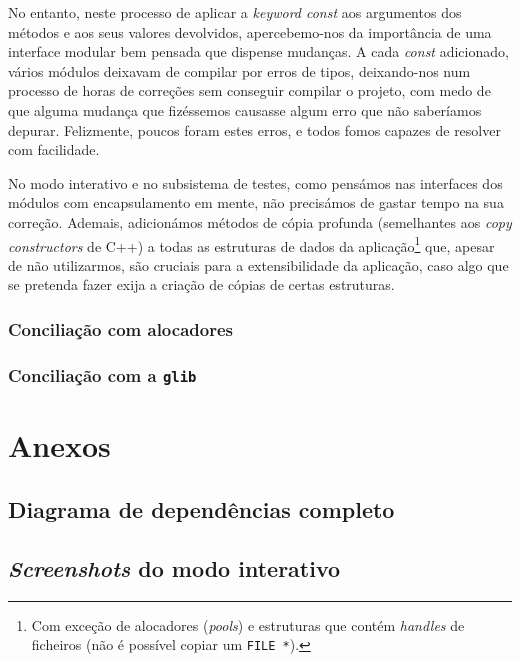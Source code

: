 \documentclass[12pt, a4paper]{article}
\begin{document}
No entanto, neste processo de aplicar a \emph{keyword const} aos argumentos dos métodos e aos seus
valores devolvidos, apercebemo-nos da importância de uma interface modular bem pensada que
dispense mudanças. A cada \emph{const} adicionado, vários módulos deixavam de compilar por erros de
tipos, deixando-nos num processo de horas de correções sem conseguir compilar o projeto, com medo de
que alguma mudança que fizéssemos causasse algum erro que não saberíamos depurar. Felizmente, poucos
foram estes erros, e todos fomos capazes de resolver com facilidade.

No modo interativo e no subsistema de testes, como pensámos nas interfaces dos módulos com
encapsulamento em mente, não precisámos de gastar tempo na sua correção. Ademais, adicionámos
métodos de cópia profunda (semelhantes aos \emph{copy constructors} de C++) a todas as estruturas
de dados da aplicação\footnote{Com exceção de alocadores (\emph{pools}) e estruturas que contém
\emph{handles} de ficheiros (não é possível copiar um \texttt{FILE *}).} que, apesar de não
utilizarmos, são cruciais para a extensibilidade da aplicação, caso algo que se pretenda fazer
exija a criação de cópias de certas estruturas.

\subsubsection{Conciliação com alocadores}
\label{sec:the-great-refactoring}

\subsubsection{Conciliação com a \texttt{glib}}
\label{sec:the-great-refactoring}

\pagebreak
\section{Anexos}
\label{sec:annexes}

\subsection{Diagrama de dependências completo}
\label{sec:complete-diagram}


\subsection{\emph{Screenshots} do modo interativo}
\label{sec:interactive-screenshots}
\end{document}
